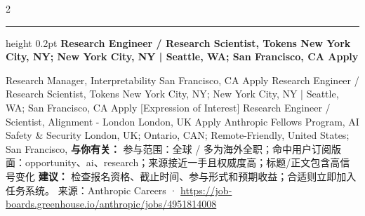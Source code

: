 \documentclass[10.5pt]{ctexart}
\begin{document}
\begin{multicols}{2}
\hrule height 0.2pt
\vspace{2mm}
{\large\bfseries Research Engineer / Research Scientist, Tokens New York City, NY; New York City, NY | Seattle, WA; San Francisco, CA Apply}\par
[Expression of Interest] Research Manager, Interpretability San Francisco, CA Apply Research Engineer / Research Scientist, Tokens New York City, NY; New York City, NY | Seattle, WA; San Francisco, CA Apply [Expression of Interest] Research Engineer / Scientist, Alignment - London London, UK Apply Anthropic Fellows Program, AI Safety \& Security London, UK; Ontario, CAN; Remote-Friendly, United States; San Francisco, 
\textbf{与你有关：} 参与范围：全球 / 多为海外全职；命中用户订阅版面：opportunity、ai、research；来源接近一手且权威度高；标题/正文包含高信号变化
\textbf{建议：} 检查报名资格、截止时间、参与形式和预期收益；合适则立即加入任务系统。
{\footnotesize\color{ormuted} 来源：Anthropic Careers · \url{https://job-boards.greenhouse.io/anthropic/jobs/4951814008}}
\end{multicols}
\end{document}
